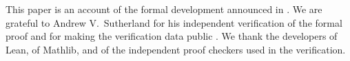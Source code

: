 This paper is an account of the formal development \cite{LeanSource2026} announced in
\cite{Announcement2026}. We are grateful to Andrew V.~Sutherland for his independent verification of
the formal proof and for making the verification data public \cite{Sutherland2026}. We thank the
developers of Lean, of Mathlib, and of the independent proof checkers used in the verification.
